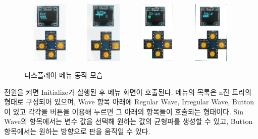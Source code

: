 \begin{figure}[H]
            \includegraphics[trim=10 1050 100 0, clip, width=0.24\textwidth, height=3cm]{images/OLED1.png} 
            \includegraphics[trim=100 1550 100 0, clip, width=0.24\textwidth, height=3cm]{images/OLED2.png}
            \includegraphics[trim=30 950 150 0,clip, width=0.24\textwidth, height=3cm]{images/OLED3.png}
            \includegraphics[trim=30 950 100 0, clip, width=0.24\textwidth, height=3cm]{images/OLED4.png}
        \caption{디스플레이 메뉴 동작 모습}
        \label{Oled}   
    \end{figure} 
    
전원을 켜면 Initialize가 실행된 후 메뉴 화면이 호출된다. 메뉴의 목록은 n진 트리의 형태로 구성되어 있으며, Wave 항목 아래에 Regular Wave, Irregular Wave, Button이 있고 각각을 버튼을 이용해 누르면 그 아래의 항목들이 호출되는 형태이다. Sin Wave의 항목에서는 변수 값을 선택해 원하는 값의 균형파를 생성할 수 있고, Button 항목에서는 원하는 방향으로 판을 움직일 수 있다.